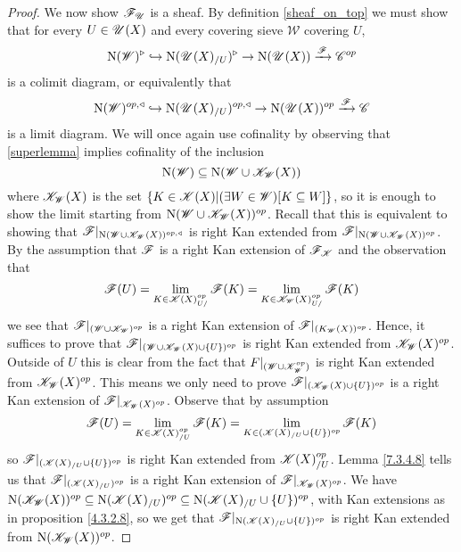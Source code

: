 \documentclass[../../thesis.tex]{subfiles}
\begin{document}
\begin{proof}
    We now show $\mathscr{F}_{\mathscr{U}}$ is a sheaf.
    By definition \ref{sheaf_on_top} we must show that for every $U\in \mathscr{U}(X)$ and every covering sieve $\mathscr{W}$ covering $U$,
    \[
        \mathrm{N}(\mathscr{W})^{\triangleright} \hookrightarrow \mathrm{N}(\mathscr{U}(X)_{/U})^{\triangleright} \rightarrow \mathrm{N}(\mathscr{U}(X))\xrightarrow{\mathscr{F}}\mathscr{C}^{op}
    \]
    is a colimit diagram, or equivalently that
    \[
        \mathrm{N}(\mathscr{W})^{op,\triangleleft} \hookrightarrow \mathrm{N}(\mathscr{U}(X)_{/U})^{op,\triangleleft} \rightarrow \mathrm{N}(\mathscr{U}(X))^{op}\xrightarrow{\mathscr{F}}\mathscr{C}
    \]
    is a limit diagram.
    We will once again use cofinality by observing that \ref{superlemma} implies cofinality of the inclusion
    \[
        \mathrm{N}(\mathscr{W}) \subseteq \mathrm{N}(\mathscr{W} \cup \mathscr{K}_{\mathscr{W}}(X))
    \]
    where $\mathscr{K}_{\mathscr{W}}(X)$ is the set $\{K\in \mathscr{K}(X) | (\exists W \in \mathscr{W})[K \subseteq W] \}$, so it is enough to show the limit starting from $ \mathrm{N}(\mathscr{W} \cup \mathscr{K}_{\mathscr{W}}(X))^{op}$.
    Recall that this is equivalent to showing that $\mathscr{F}|_{\mathrm{N}(\mathscr{W} \cup \mathscr{K}_{\mathscr{W}}(X))^{op,\triangleleft}}$ is right Kan extended from $\mathscr{F}|_{\mathrm{N}(\mathscr{W} \cup \mathscr{K}_{\mathscr{W}}(X))^{op}}$.
    By the assumption that $\mathscr{F}$ is a right Kan extension of $\mathscr{F}_{\mathscr{K}}$ and the observation that
    \[
        \F(U) = \lim_{K\in \K(X)^{op}_{U/}}\F(K) = \lim_{K\in \K_{\W}(X)^{op}_{U/}}\F(K) %
    \]
    we see that $\mathscr{F}|_{(\mathscr{W} \cup \mathscr{K}_{\mathscr{W}})^{op}}$ is a right Kan extension of $\mathscr{F}|_{(K_{\mathscr{W}}(X))^{op}}$.
    Hence, it suffices to prove that $\mathscr{F}|_{(\mathscr{W} \cup \mathscr{K}_{\mathscr{W}}(X)\cup \{U\})^{op}}$ is right Kan extended from $\mathscr{K}_{\mathscr{W}}(X)^{op}$.
    Outside of $U$ this is clear from the fact that $F|_{(\mathscr{W} \cup \mathscr{K}_{\mathscr{W}}^{op})}$ is right Kan extended from $\mathscr{K}_{\mathscr{W}}(X)^{op}$.
    This means we only need to prove $\mathscr{F}|_{(\mathscr{K}_{\mathscr{W}}(X)\cup \{U\})^{op}}$ is a right Kan extension of $\mathscr{F}|_{\mathscr{K}_{\mathscr{W}}(X)^{op}}$.
    Observe that by assumption
    \[
        \mathscr{F}(U)  = \lim_{K\in \mathscr{K}(X)_{/U}^{op}} \mathscr{F}(K) = \lim_{K\in (\mathscr{K}(X)_{/U} \cup \{U\})^{op}} \mathscr{F}(K)
    \]
    so $\mathscr{F}|_{(\mathscr{K}(X)_{/U} \cup \{U\})^{op}}$ is right Kan extended from $\mathscr{K}(X)_{/U}^{op}$.
    Lemma \ref{7.3.4.8} tells us that $\mathscr{F}|_{(\mathscr{K}(X)_{/U})^{op}}$ is a right Kan extension of $\mathscr{F}|_{\mathscr{K}_{\mathscr{W}}(X)^{op}}$.
    We have ${\mathrm{N}(\mathscr{K}_{\mathscr{W}}(X))^{op} \subseteq\mathrm{N}(\mathscr{K}(X)_{/U})^{op} \subseteq\mathrm{N}(\mathscr{K}(X)_{/U} \cup \{U\})^{op}}$, with Kan extensions as in proposition \ref{4.3.2.8}, so we get that ${\mathscr{F}|_{\mathrm{N}(\mathscr{K}(X)_{/U} \cup \{U\})^{op}}}$ is right Kan extended from ${\mathrm{N}(\mathscr{K}_{\mathscr{W}}(X))^{op}}$.

\end{proof}
\end{document}
